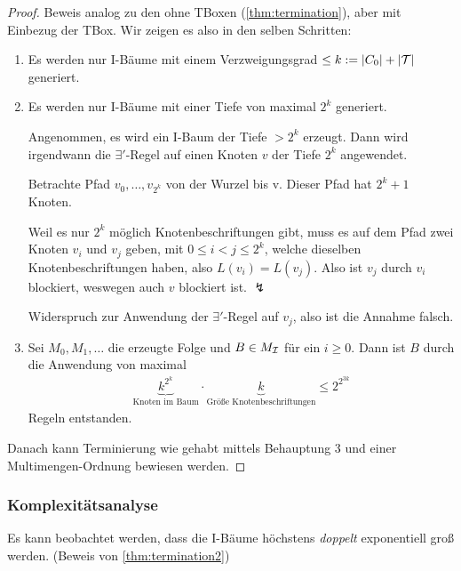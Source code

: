 \begin{proof}
    Beweis analog zu den ohne TBoxen (\autoref{thm:termination}), aber mit Einbezug der TBox. Wir zeigen es also in den selben Schritten:

\begin{enumerate}
\item
  Es werden nur I-Bäume mit einem Verzweigungsgrad $\leq k := \left| C_0 \right| + \left| \MT \right|$ generiert.
\item
  Es werden nur I-Bäume mit einer Tiefe von maximal $2^k$ generiert.
  \begin{tafel}
  Angenommen, es wird ein I-Baum der Tiefe $> 2^k$ erzeugt. Dann wird irgendwann die $\exists '$-Regel auf einen Knoten $v$ der Tiefe $2^k$ angewendet.

  Betrachte Pfad $v_0, \ldots , v_{2^k}$ von der Wurzel bis v. Dieser Pfad hat $2^k+1$ Knoten.

  Weil es nur $2^k$ möglich Knotenbeschriftungen gibt, muss es auf dem Pfad zwei Knoten $v_i$ und $v_j$ geben, mit $0 \leq i < j \leq 2^k$, welche dieselben Knotenbeschriftungen haben, also $L(v_i) = L(v_j)$. Also ist $v_j$ durch $v_i$ blockiert, weswegen auch $v$ blockiert ist. $\lightning$

  Widerspruch zur Anwendung der $\exists '$-Regel auf $v_j$, also ist die Annahme falsch.
  \end{tafel}
\item
  Sei $M_0,M_1,\ldots$ die erzeugte Folge und $B \in M_{\mathcal{I}}$ für
  ein $i \geq 0$. Dann ist $B$ durch die Anwendung von maximal
  \begin{align*}
      \underbrace{k^{2^k}}_\text{Knoten im Baum} \cdot
      \underbrace{k}_\text{Größe Knotenbeschriftungen} \leq 2^{2^{3k}}
  \end{align*}
  Regeln entstanden.
\end{enumerate}

Danach kann Terminierung wie gehabt mittels Behauptung 3 und einer Multimengen-Ordnung bewiesen werden.

\end{proof}

\subsubsection{Komplexitätsanalyse}

Es kann beobachtet werden, dass die I-Bäume höchstens \emph{doppelt} exponentiell groß werden. (Beweis von \autoref{thm:termination2})

